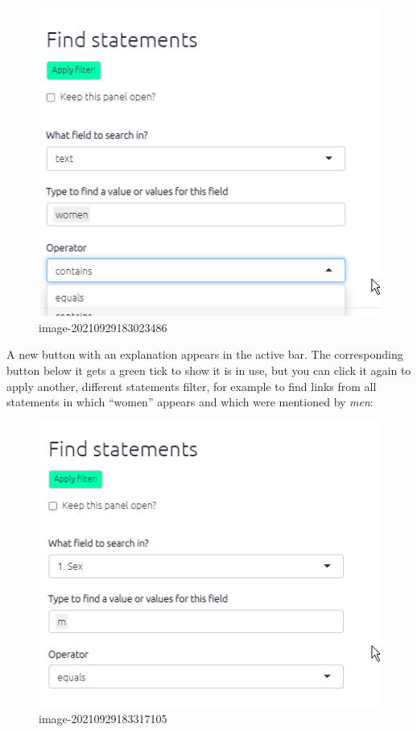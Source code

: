 \documentclass[
]{book}
\begin{document}
\begin{figure}
\centering
\includegraphics[width=6.77083in,height=\textheight]{_assets/image-20210929183023486.png}
\caption{image-20210929183023486}
\end{figure}

A new button with an explanation appears in the active bar. The corresponding button below it gets a green tick to show it is in use, but you can click it again to apply another, different statements filter, for example to find links from all statements in which ``women'' appears and which were mentioned by \emph{men}:

\begin{figure}
\centering
\includegraphics[width=6.77083in,height=\textheight]{_assets/image-20210929183317105.png}
\caption{image-20210929183317105}
\end{figure}
\end{document}
